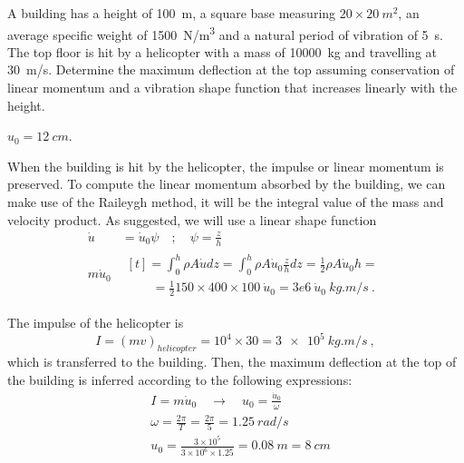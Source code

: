 
\begin{Exercise}[label={helicopter_impulse}]
A building has a height of \SI{100}{m}, a square base measuring $20\times\SI{20}{m^2}$, an average specific weight of \SI{1500}{N/m^3} and a natural period of vibration of \SI{5}{s}. The top floor is hit by a helicopter with a mass of \SI{10000}{kg} and travelling at \SI{30}{m/s}. Determine the maximum deflection at the top assuming conservation of linear momentum and a vibration shape function that increases linearly with the height.

\begin{center}
\end{center}

\shortAnswer $u_0 = \SI{12}{cm}$.
\end{Exercise}



\begin{Answer}[ref={helicopter_impulse}]
When the building is hit by the helicopter, the impulse or linear momentum is preserved. To compute the linear momentum absorbed by the building, we can make use of the Raileygh method, it will be the integral value of the mass and velocity product. As suggested, we will use a linear shape function
\begin{align*}
\dot{u}& = \dot{u}_0\psi \quad ; \quad \psi = \frac{z}{h} \\
m\dot{u}_0& \begin{multlined}[t] = \int_0^h \rho A\dot{u}dz = \int_0^h \rho A\dot{u}_0\frac{z}{h}dz = \frac{1}{2}\rho A\dot{u}_0h = \\
    \qquad= \frac{1}{2}150\times400\times100\ \dot{u}_0
        = 3e6\ \dot{u}_0\ \si{kg.m/s}\ .\end{multlined}
\end{align*}

The impulse of the helicopter is
$$
I = (mv)_{helicopter} = 10^4 \times 30 = \SI{3e5}{kg.m/s}\ ,
$$
which is transferred to the building. Then, the maximum deflection at the top of the building is inferred according to the following expressions:
\begin{align*}
&I = m\dot{u}_0 \quad \rightarrow \quad u_0 = \frac{\dot{u}_0}{\omega} \\
&\omega = \frac{2\pi}{T} = \frac{2\pi}{5} = \SI{1.25}{rad/s} \\
&u_0 = \frac{3\times 10^5}{3\times 10^6\times 1.25} = \SI{0.08}{m} = \SI{8}{cm}
\end{align*}

\end{Answer}
